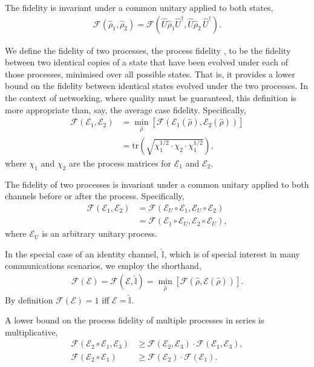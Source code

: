 The fidelity is invariant under a common unitary applied to both states,
\begin{align}
\mathcal{F}(\hat\rho_1,\hat\rho_2) = \mathcal{F}(\hat{U}\hat\rho_1 \hat{U}^\dag,\hat{U} \hat\rho_2\,\hat{U}^\dag).
\end{align}

We define the fidelity of two processes, the process fidelity  \cite{bib:Gilchrist05}, to be the fidelity between two identical copies of a state that have been evolved under each of those processes, minimised over all possible states. That is, it provides a lower bound on the fidelity between identical states evolved under the two processes. In the context of networking, where quality must be guaranteed, this definition is more appropriate than, say, the average case fidelity. Specifically,
\begin{align}
\mathcal{F}(\mathcal{E}_1,\mathcal{E}_2) &= \min_{\hat\rho} \left[\mathcal{F}(\mathcal{E}_1(\hat\rho),\mathcal{E}_2(\hat\rho))\right] \nonumber \\
&= \text{tr}\left(\sqrt{\chi_1^{1/2}\cdot\chi_2\cdot\chi_1^{1/2}}\right),
\end{align}
 where $\chi_1$ and $\chi_2$ are the process matrices for $\mathcal{E}_1$ and $\mathcal{E}_2$.

The fidelity of two processes is invariant under a common unitary applied to both channels before or after the process. Specifically,
\begin{align}
\mathcal{F}(\mathcal{E}_1,\mathcal{E}_2) &= \mathcal{F}(\mathcal{E}_U\circ\mathcal{E}_1,\mathcal{E}_U\circ\mathcal{E}_2) \nonumber \\
&= \mathcal{F}(\mathcal{E}_1\circ \mathcal{E}_U,\mathcal{E}_2\circ \mathcal{E}_U),
\end{align}
where $\mathcal{E}_U$ is an arbitrary unitary process.

In the special case of an identity channel, $\hat{\mathbb{I}}$, which is of special interest in many communications scenarios, we employ the shorthand,
\begin{align}
\mathcal{F}(\mathcal{E}) = \mathcal{F}(\mathcal{E},\hat{\mathbb{I}}) = \min_{\hat\rho} \left[\mathcal{F}(\hat\rho,\mathcal{E}(\hat\rho))\right].
\end{align}
By definition \mbox{$\mathcal{F}(\mathcal{E})=1$} iff \mbox{$\mathcal{E}=\hat{\mathbb{I}}$}.

A lower bound on the process fidelity of multiple processes in series is multiplicative,
\begin{align}
\mathcal{F}(\mathcal{E}_2\circ\mathcal{E}_1,\mathcal{E}_3) &\geq \mathcal{F}(\mathcal{E}_2,\mathcal{E}_3)\cdot\mathcal{F}(\mathcal{E}_1,\mathcal{E}_3), \nonumber \\
\mathcal{F}(\mathcal{E}_2\circ\mathcal{E}_1) &\geq \mathcal{F}(\mathcal{E}_2)\cdot\mathcal{F}(\mathcal{E}_1).
\end{align}

